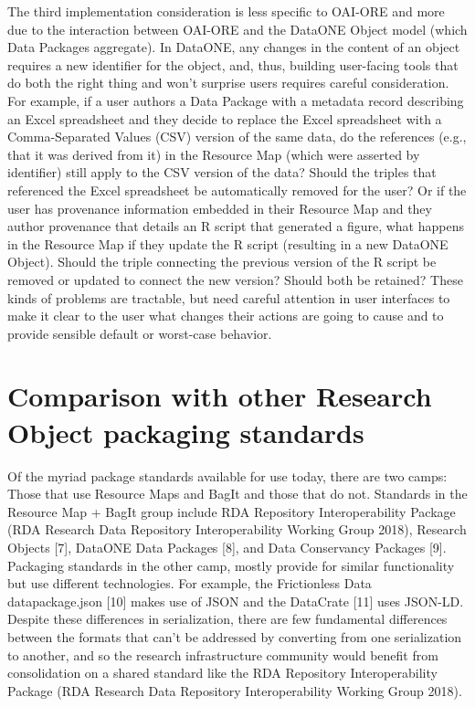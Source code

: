 \documentclass[conference]{IEEEtran}
\begin{document}
The third implementation consideration is less specific to OAI-ORE and more due to the interaction between OAI-ORE and the DataONE Object model (which Data Packages aggregate). In DataONE, any changes in the content of an object requires a new identifier for the object, and, thus, building user-facing tools that do both the right thing and won’t surprise users requires careful consideration. For example, if a user authors a Data Package with a metadata record describing an Excel spreadsheet and they decide to replace the Excel spreadsheet with a Comma-Separated Values (CSV) version of the same data, do the references (e.g., that it was derived from it) in the Resource Map (which were asserted by identifier) still apply to the CSV version of the data? Should the triples that referenced the Excel spreadsheet be automatically removed for the user? Or if the user has provenance information embedded in their Resource Map and they author provenance that details an R script that generated a figure, what happens in the Resource Map if they update the R script (resulting in a new DataONE Object). Should the triple connecting the previous version of the R script be removed or updated to connect the new version? Should both be retained? These kinds of problems are tractable, but need careful attention in user interfaces to make it clear to the user what changes their actions are going to cause and to provide sensible default or worst-case behavior.


\section{Comparison with other Research Object packaging standards}

Of the myriad package standards available for use today, there are two camps: Those that use Resource Maps and BagIt and those that do not. Standards in the Resource Map + BagIt group include RDA Repository Interoperability Package (RDA Research Data Repository Interoperability Working Group 2018), Research Objects [7], DataONE Data Packages [8], and Data Conservancy Packages [9]. Packaging standards in the other camp, mostly provide for similar functionality but use different technologies. For example, the Frictionless Data datapackage.json [10] makes use of JSON and the DataCrate [11] uses JSON-LD. Despite these differences in serialization, there are few fundamental differences between the formats that can’t be addressed by converting from one serialization to another, and so the research infrastructure community would benefit from consolidation on a shared standard like the RDA Repository Interoperability Package (RDA Research Data Repository Interoperability Working Group 2018).
\end{document}
